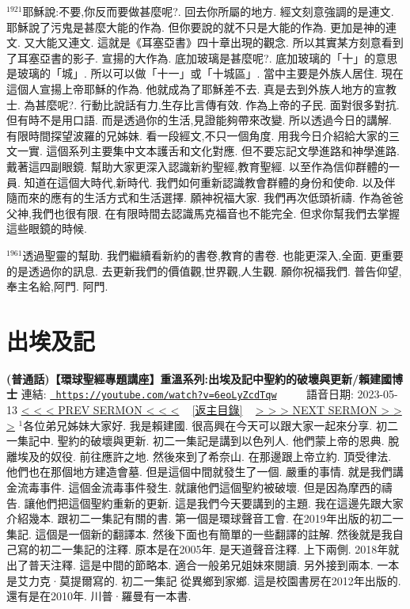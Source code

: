 \documentclass{book}
\begin{document}
$^{1921}$耶穌說:不要,你反而要做甚麼呢?.
回去你所屬的地方.
經文刻意強調的是連文.
耶穌說了污鬼是甚麼大能的作為.
但你要說的就不只是大能的作為.
更加是神的連文.
又大能又連文.
這就是《耳塞亞書》四十章出現的觀念.
所以其實某方刻意看到了耳塞亞書的影子.
宣揚的大作為.
底加玻璃是甚麼呢?.
底加玻璃的「十」的意思是玻璃的「城」.
所以可以做「十一」或「十城區」.
當中主要是外族人居住.
現在這個人宣揚上帝耶穌的作為.
他就成為了耶穌差不去.
真是去到外族人地方的宣教士.
為甚麼呢?.
行動比說話有力,生存比言傳有效.
作為上帝的子民.
面對很多對抗.
但有時不是用口語.
而是透過你的生活,見證能夠帶來改變.
所以透過今日的講解.
有限時間探望波羅的兄姊妹.
看一段經文,不只一個角度.
用我今日介紹給大家的三文一實.
這個系列主要集中文本護舌和文化對應.
但不要忘記文學進路和神學進路.
戴著這四副眼鏡.
幫助大家更深入認識新約聖經,教育聖經.
以至作為信仰群體的一員.
知道在這個大時代,新時代.
我們如何重新認識教會群體的身份和使命.
以及伴隨而來的應有的生活方式和生活選擇.
願神祝福大家.
我們再次低頭祈禱.
作為爸爸父神,我們也很有限.
在有限時間去認識馬克福音也不能完全.
但求你幫我們去掌握這些眼鏡的時候.

$^{1961}$透過聖靈的幫助.
我們繼續看新約的書卷,教育的書卷.
也能更深入,全面.
更重要的是透過你的訊息.
去更新我們的價值觀,世界觀,人生觀.
願你祝福我們.
普告仰望,奉主名給,阿門.
阿門.
\newpage



\section{出埃及記}
\label{sec:6eoLyZcdTqw}
\textbf{(普通話)【環球聖經專題講座】重溫系列:出埃及記中聖約的破壞與更新/賴建國博士}
\newline
\newline
連結: \href{https://youtube.com/watch?v=6eoLyZcdTqw}{\texttt{ https://youtube.com/watch?v=6eoLyZcdTqw}} ~~~~ 語音日期: 2023-05-13 
\newline
\newline
\hyperref[sec:XC_bvKu337s]{\small{< < < PREV SERMON < < <}}
~
\hyperref[sec:index]{\small{[返主目錄]}}
~
\hyperref[sec:code]{\small{> > > NEXT SERMON > > >}}
\newline
\newline
$^{1}$各位弟兄姊妹大家好.
我是賴建國.
很高興在今天可以跟大家一起來分享.
初二一集記中.
聖約的破壞與更新.
初二一集記是講到以色列人.
他們蒙上帝的恩典.
脫離埃及的奴役.
前往應許之地.
然後來到了希奈山.
在那邊跟上帝立約.
頂受律法.
他們也在那個地方建造會墓.
但是這個中間就發生了一個.
嚴重的事情.
就是我們講金流毒事件.
這個金流毒事件發生.
就讓他們這個聖約被破壞.
但是因為摩西的禱告.
讓他們把這個聖約重新的更新.
這是我們今天要講到的主題.
我在這邊先跟大家介紹幾本.
跟初二一集記有關的書.
第一個是環球聲音工會.
在2019年出版的初二一集記.
這個是一個新的翻譯本.
然後下面也有簡單的一些翻譯的註解.
然後就是我自己寫的初二一集記的注釋.
原本是在2005年.
是天道聲音注釋.
上下兩側.
2018年就出了普天注釋.
這是中間的節略本.
適合一般弟兄姐妹來閱讀.
另外接到兩本.
一本是艾力克·莫提爾寫的.
初二一集記 從異鄉到家鄉.
這是校園書房在2012年出版的.
還有是在2010年.
川普·羅曼有一本書.
\end{document}
